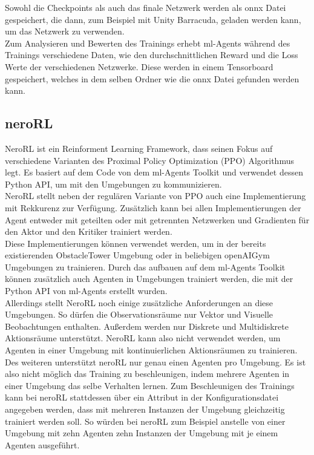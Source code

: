 \noindent Sowohl die Checkpoints als auch das finale Netzwerk werden als onnx Datei gespeichert, die dann, zum Beispiel mit Unity Barracuda, geladen werden kann, um das Netzwerk zu verwenden.\\
Zum Analysieren und Bewerten des Trainings erhebt ml-Agents während des Trainings verschiedene Daten, wie den durchschnittlichen Reward und die Loss Werte der verschiedenen Netzwerke. Diese werden in einem Tensorboard gespeichert, welches in dem selben Ordner wie die onnx Datei gefunden werden kann. 

\subsection{neroRL}

NeroRL ist ein Reinforment Learning Framework, dass seinen Fokus auf verschiedene Varianten des Proximal Policy Optimization (PPO) Algorithmus legt. Es basiert auf dem Code von dem ml-Agents Toolkit und verwendet dessen Python API, um mit den Umgebungen zu kommunizieren. \\
NeroRL stellt neben der regulären Variante von PPO auch eine Implementierung mit Rekkurenz zur Verfügung. Zusätzlich kann bei allen Implementierungen der Agent entweder mit geteilten oder mit getrennten Netzwerken und Gradienten für den Aktor und den Kritiker trainiert werden. \\
Diese Implementierungen können verwendet werden, um in der bereits existierenden ObstacleTower Umgebung oder in beliebigen openAIGym Umgebungen zu trainieren. Durch das aufbauen auf dem ml-Agents Toolkit können zusätzlich auch Agenten in Umgebungen trainiert werden, die mit der Python API von ml-Agents erstellt wurden.\\
Allerdings stellt NeroRL noch einige zusätzliche Anforderungen an diese Umgebungen. So dürfen die Observationsräume nur Vektor und Visuelle Beobachtungen enthalten. Außerdem werden nur Diskrete und Multidiskrete Aktionsräume unterstützt. NeroRL kann also nicht verwendet werden, um Agenten in einer Umgebung mit kontinuierlichen Aktionsräumen zu trainieren.
Des weiteren unterstützt neroRL nur genau einen Agenten pro Umgebung. Es ist also nicht möglich das Training zu beschleunigen, indem mehrere Agenten in einer Umgebung das selbe Verhalten lernen. Zum Beschleunigen des Trainings kann bei neroRL stattdessen über ein Attribut in der Konfigurationsdatei angegeben werden, dass mit mehreren Instanzen der Umgebung gleichzeitig trainiert werden soll. So würden bei neroRL zum Beispiel anstelle von einer Umgebung mit zehn Agenten zehn Instanzen der Umgebung mit je einem Agenten ausgeführt.\\

